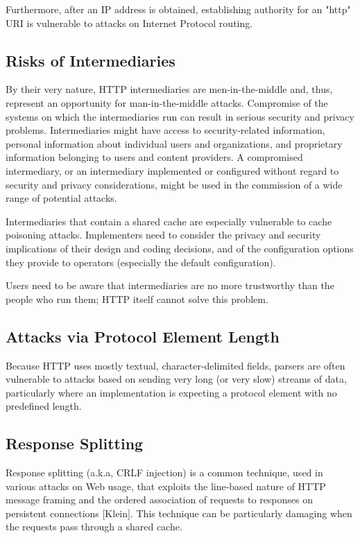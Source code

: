 Furthermore, after an IP address is obtained, establishing authority
for an "http" URI is vulnerable to attacks on Internet Protocol
routing.


\subsection{Risks of Intermediaries}

By their very nature, HTTP intermediaries are men-in-the-middle and,
thus, represent an opportunity for man-in-the-middle attacks.
Compromise of the systems on which the intermediaries run can result
in serious security and privacy problems.  Intermediaries might have
access to security-related information, personal information about
individual users and organizations, and proprietary information
belonging to users and content providers.  A compromised
intermediary, or an intermediary implemented or configured without
regard to security and privacy considerations, might be used in the
commission of a wide range of potential attacks.

Intermediaries that contain a shared cache are especially vulnerable
to cache poisoning attacks.
Implementers need to consider the privacy and security implications
of their design and coding decisions, and of the configuration
options they provide to operators (especially the default
configuration).

Users need to be aware that intermediaries are no more trustworthy
than the people who run them; HTTP itself cannot solve this problem.

\subsection{Attacks via Protocol Element Length}

Because HTTP uses mostly textual, character-delimited fields, parsers
are often vulnerable to attacks based on sending very long (or very
slow) streams of data, particularly where an implementation is
expecting a protocol element with no predefined length.



\subsection{Response Splitting}

Response splitting (a.k.a, CRLF injection) is a common technique,
used in various attacks on Web usage, that exploits the line-based
nature of HTTP message framing and the ordered association of
requests to responses on persistent connections [Klein].  This
technique can be particularly damaging when the requests pass through
a shared cache.

